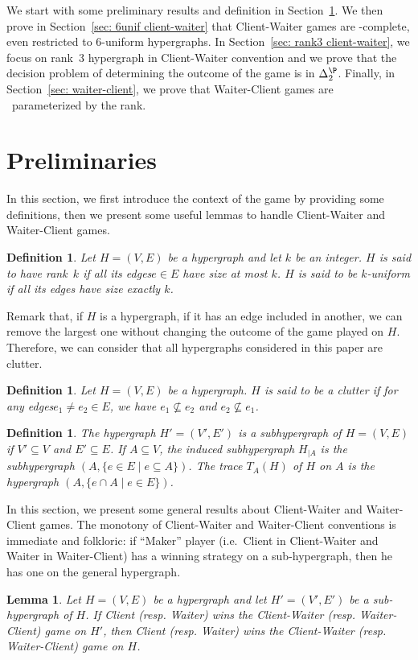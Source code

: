 \documentclass{article}
\newcommand{\hyp}{H}
\newcommand{\WS}{E}
\newcommand{\som}{V}
\newcommand{\hxf}{\hyp = (\som, \WS)}
\newcommand{\hedge}{edge\xspace}
\newcommand{\hedges}{edges\xspace}
\newtheorem{lemma}[theorem]{Lemma}
\newtheorem{definition}[theorem]{Definition}
\begin{document}
We start with some preliminary results and definition in Section~\ref{sec: preliminaries}. We then prove in Section~\ref{sec: 6unif client-waiter} that Client-Waiter games are \PSPACE-complete, even restricted to $6$-uniform hypergraphs. In Section~\ref{sec: rank3 client-waiter}, we focus on rank~3 hypergraph in Client-Waiter convention and we prove that the decision problem of determining the outcome of the game is in $\Delta_2^{\P}$. Finally, in Section~\ref{sec: waiter-client}, we prove that Waiter-Client games are \FPT\ parameterized by the rank.



\section{Preliminaries}\label{sec: preliminaries}

In this section, we first introduce the context of the game by providing some definitions, then we present some useful lemmas to handle Client-Waiter and Waiter-Client games.

\begin{definition}
    Let $H = (V,E)$ be a hypergraph and let $k$ be an integer. $H$ is said to have {\em rank~$k$} if all its \hedges $e \in E$ have size at most $k$. $H$ is said to be $k$-uniform if all its \hedges have size exactly $k$.
\end{definition}

Remark that, if $H$ is a hypergraph, if it has an \hedge included in another, we can remove the largest one without changing the outcome of the game played on $H$. Therefore, we can consider that all hypergraphs considered in this paper are clutter.

\begin{definition}
    Let $H = (V,E)$ be a hypergraph. $H$ is said to be a {\em clutter} if for any \hedges $e_1 \neq e_2 \in E$, we have $e_1 \not \subseteq e_2$ and $e_2 \not \subseteq e_1$.
\end{definition}

\begin{definition}
    The hypergraph \(H'=(V',E')\) is a subhypergraph of \(H = (V,E)\) if \(V' \subseteq V\) and \(E' \subseteq E\). If \(A \subseteq V\), the induced subhypergraph \(H_{|A}\) is the subhypergraph \((A,\{e \in E \mid e \subseteq A\})\). The trace \(T_A(H)\) of \(H\) on \(A\) is the hypergraph \((A,\{e \cap A \mid e \in E\})\). 
\end{definition}

In this section, we present some general results about Client-Waiter and Waiter-Client games. The monotony of Client-Waiter and Waiter-Client conventions is immediate and folkloric: 
if ``Maker'' player (i.e.\ Client in Client-Waiter and Waiter in Waiter-Client) has a winning strategy on a sub-hypergraph, then he has one on the general hypergraph.
\begin{lemma}\label{lem: sub-hypergraph}
    Let $\hxf$ be a hypergraph and let $\hyp' = (\som', \WS')$ be a sub-hypergraph of $\hyp$. If Client (resp. Waiter) wins the Client-Waiter (resp. Waiter-Client) game on $\hyp'$, then Client (resp. Waiter) wins the Client-Waiter (resp. Waiter-Client) game on $\hyp$.
\end{lemma}
\end{document}
